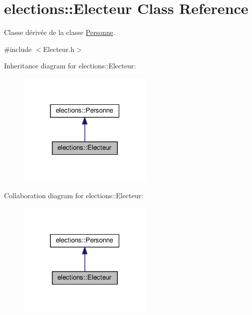 \hypertarget{classelections_1_1Electeur}{}\section{elections\+:\+:Electeur Class Reference}
\label{classelections_1_1Electeur}


Classe dérivée de la classe \hyperlink{classelections_1_1Personne}{Personne}.  




{\ttfamily \#include $<$Electeur.\+h$>$}



Inheritance diagram for elections\+:\+:Electeur\+:\nopagebreak
\begin{figure}[H]
\begin{center}
\leavevmode
\includegraphics[width=183pt]{classelections_1_1Electeur__inherit__graph}
\end{center}
\end{figure}


Collaboration diagram for elections\+:\+:Electeur\+:\nopagebreak
\begin{figure}[H]
\begin{center}
\leavevmode
\includegraphics[width=183pt]{classelections_1_1Electeur__coll__graph}
\end{center}
\end{figure}
